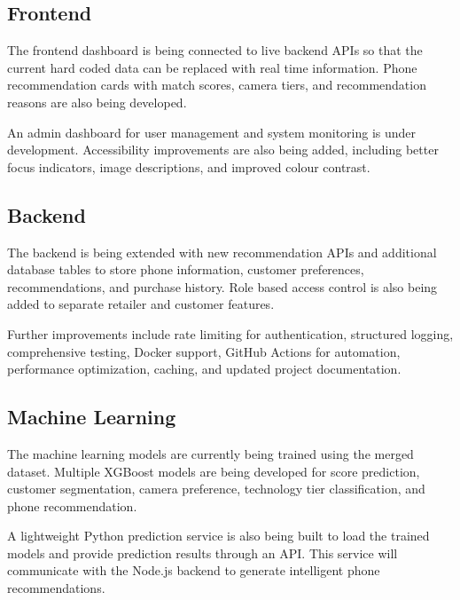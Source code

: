 \documentclass[12pt, a4paper]{report}
\numberwithin{equation}{chapter}
\begin{document}
\subsection{Frontend}

The frontend dashboard is being connected to live backend APIs so that the current hard coded data can be replaced with real time information. Phone recommendation cards with match scores, camera tiers, and recommendation reasons are also being developed.

An admin dashboard for user management and system monitoring is under development. Accessibility improvements are also being added, including better focus indicators, image descriptions, and improved colour contrast.

\subsection{Backend}

The backend is being extended with new recommendation APIs and additional database tables to store phone information, customer preferences, recommendations, and purchase history. Role based access control is also being added to separate retailer and customer features.

Further improvements include rate limiting for authentication, structured logging, comprehensive testing, Docker support, GitHub Actions for automation, performance optimization, caching, and updated project documentation.

\subsection{Machine Learning}

The machine learning models are currently being trained using the merged dataset. Multiple XGBoost models are being developed for score prediction, customer segmentation, camera preference, technology tier classification, and phone recommendation.

A lightweight Python prediction service is also being built to load the trained models and provide prediction results through an API. This service will communicate with the Node.js backend to generate intelligent phone recommendations.
\end{document}
